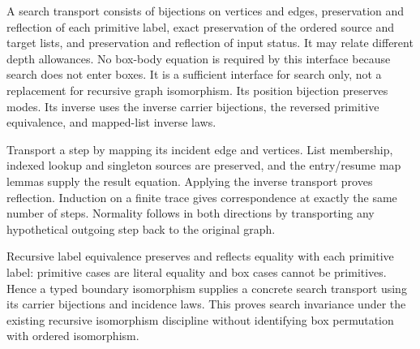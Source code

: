 A search transport consists of bijections on vertices and edges, preservation
and reflection of each primitive label, exact preservation of the ordered
source and target lists, and preservation and reflection of input status.
It may relate different depth allowances. No box-body equation is required by
this interface because search does not enter boxes. It is a sufficient
interface for search only, not a replacement for recursive graph isomorphism.
Its position bijection preserves modes. Its inverse uses the inverse carrier
bijections, the reversed primitive equivalence, and mapped-list inverse laws.




Transport a step by mapping its incident edge and vertices. List membership,
indexed lookup and singleton sources are preserved, and the entry/resume map
lemmas supply the result equation. Applying the inverse transport proves
reflection. Induction on a finite trace gives correspondence at exactly the
same number of steps. Normality follows in both directions by transporting any
hypothetical outgoing step back to the original graph.





Recursive label equivalence preserves and reflects equality with each
primitive label: primitive cases are literal equality and box cases cannot
be primitives. Hence a typed boundary isomorphism supplies a concrete search
transport using its carrier bijections and incidence laws. This proves search
invariance under the existing recursive isomorphism discipline without
identifying box permutation with ordered isomorphism.




